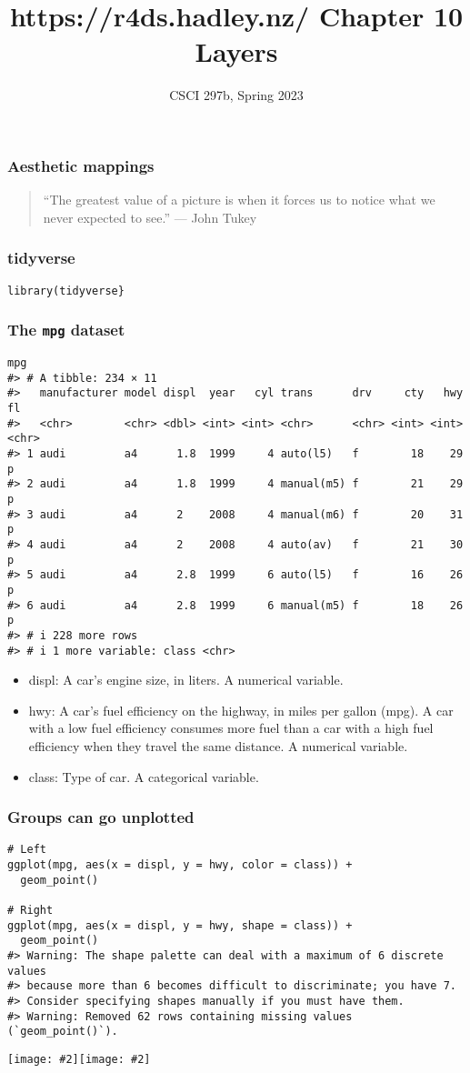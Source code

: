 \documentclass{beamer}
\title{{https://r4ds.hadley.nz/} Chapter 10\\Layers}
\author{CSCI 297b, Spring 2023}
\newcommand{\bi}{\begin{itemize}}
\newcommand{\li}{\item}
\newcommand{\ei}{\end{itemize}}
\newcommand{\figg}[2]{\texttt{[image: \#2]}}
\newcommand{\bfr}[1]{\begin{frame}[fragile]\frametitle{{ #1 }}}
\begin{document}
\bfr{Aesthetic mappings}

\begin{quotation}
“The greatest value of a picture is when it forces us to notice what we never expected to see.” — John Tukey
\end{quotation}
\end{frame}
\begin{frame}
\maketitle
\end{frame}

\bfr{tidyverse}

\begin{verbatim}
library(tidyverse}
\end{verbatim}
\end{frame}



\bfr{The {\tt mpg} dataset}\scriptsize
\begin{verbatim}
mpg
#> # A tibble: 234 × 11
#>   manufacturer model displ  year   cyl trans      drv     cty   hwy fl   
#>   <chr>        <chr> <dbl> <int> <int> <chr>      <chr> <int> <int> <chr>
#> 1 audi         a4      1.8  1999     4 auto(l5)   f        18    29 p    
#> 2 audi         a4      1.8  1999     4 manual(m5) f        21    29 p    
#> 3 audi         a4      2    2008     4 manual(m6) f        20    31 p    
#> 4 audi         a4      2    2008     4 auto(av)   f        21    30 p    
#> 5 audi         a4      2.8  1999     6 auto(l5)   f        16    26 p    
#> 6 audi         a4      2.8  1999     6 manual(m5) f        18    26 p    
#> # i 228 more rows
#> # i 1 more variable: class <chr>
\end{verbatim}
\bi
\li displ: A car’s engine size, in liters. A numerical variable.
\li
hwy: A car’s fuel efficiency on the highway, in miles per gallon (mpg). A car with a low fuel efficiency consumes more fuel than a car with a high fuel efficiency when they travel the same distance. A numerical variable.
\li
class: Type of car. A categorical variable.
\ei
\end{frame}

\bfr{Groups can go unplotted}\scriptsize
\begin{verbatim}
# Left
ggplot(mpg, aes(x = displ, y = hwy, color = class)) +
  geom_point()

# Right
ggplot(mpg, aes(x = displ, y = hwy, shape = class)) +
  geom_point()
#> Warning: The shape palette can deal with a maximum of 6 discrete values
#> because more than 6 becomes difficult to discriminate; you have 7.
#> Consider specifying shapes manually if you must have them.
#> Warning: Removed 62 rows containing missing values (`geom_point()`).
\end{verbatim}
\figg{.5}{unnamed-chunk-4-1.png}\figg{.5}{unnamed-chunk-4-2.png}
\end{frame}
\end{document}
